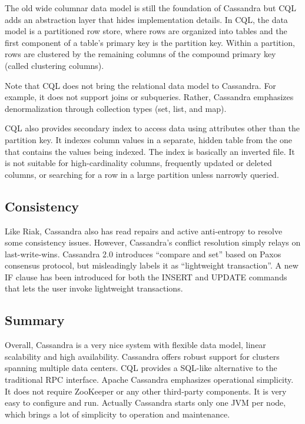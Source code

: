 \documentclass[11pt]{book}
\begin{document}
The old wide columnar data model is still the foundation of Cassandra but CQL adds an abstraction layer that hides implementation details. In CQL, the data model is a partitioned row store, where rows are organized into tables and the first component of a table's primary key is the partition key. Within a partition, rows are clustered by the remaining columns of the compound primary key (called clustering columns).

Note that CQL does not bring the relational data model to Cassandra. For example, it does not support joins or subqueries. Rather, Cassandra emphasizes denormalization through collection types (set, list, and map).

CQL also provides secondary index to access data using attributes other than the partition key. It indexes column values in a separate, hidden table from the one that contains the values being indexed. The index is basically an inverted file. It is not suitable for high-cardinality columns, frequently updated or deleted columns, or searching for a row in a large partition unless narrowly queried.

\subsection{Consistency}

Like Riak, Cassandra also has read repairs and active anti-entropy to resolve some consistency issues. However, Cassandra's conflict resolution simply relays on last-write-wins. Cassandra 2.0 introduces ``compare and set'' based on Paxos consensus protocol, but misleadingly labels it as ``lightweight transaction''. A new IF clause has been introduced for both the INSERT and UPDATE commands that lets the user invoke lightweight transactions.

\subsection{Summary}
Overall, Cassandra is a very nice system with flexible data model, linear scalability and high availability. 
Cassandra offers robust support for clusters spanning multiple data centers. CQL provides a SQL-like alternative to the traditional RPC interface.
Apache Cassandra emphasizes operational simplicity. It does not require ZooKeeper or any other third-party components. It is very easy to configure and run. Actually Cassandra starts only one JVM per node, which brings a lot of simplicity to operation and maintenance.
\end{document}
